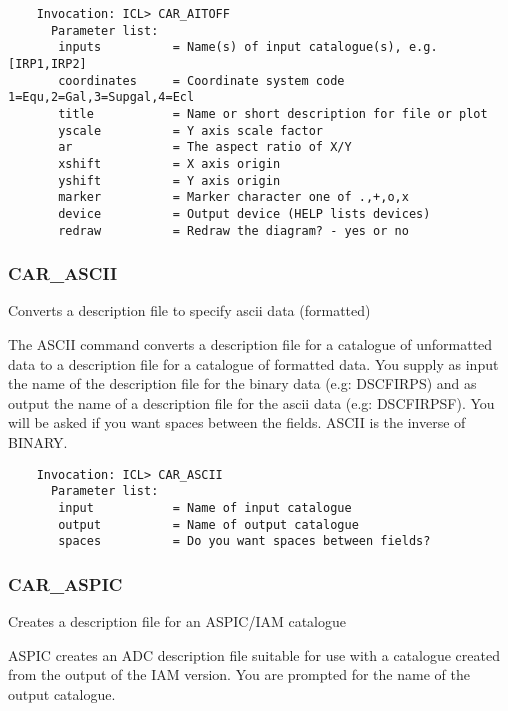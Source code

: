\begin{verbatim}
    Invocation: ICL> CAR_AITOFF
      Parameter list:
       inputs          = Name(s) of input catalogue(s), e.g. [IRP1,IRP2]
       coordinates     = Coordinate system code 1=Equ,2=Gal,3=Supgal,4=Ecl
       title           = Name or short description for file or plot
       yscale          = Y axis scale factor
       ar              = The aspect ratio of X/Y
       xshift          = X axis origin
       yshift          = Y axis origin
       marker          = Marker character one of .,+,o,x
       device          = Output device (HELP lists devices)
       redraw          = Redraw the diagram? - yes or no
\end{verbatim}

\subsubsection{CAR\_ASCII}

Converts a description file to specify ascii data (formatted)

The ASCII command converts a description file for a catalogue  of
unformatted  data  to a description file for a catalogue of formatted
data.
You supply as input the name of the description file for the
binary data (e.g: DSCFIRPS) and as output the name of a description
file for the ascii data (e.g: DSCFIRPSF).
You will be asked if you want spaces between the fields.
ASCII is the inverse of BINARY.

\begin{verbatim}
    Invocation: ICL> CAR_ASCII
      Parameter list:
       input           = Name of input catalogue
       output          = Name of output catalogue
       spaces          = Do you want spaces between fields?
\end{verbatim}

\subsubsection{CAR\_ASPIC}

Creates a description file for an ASPIC/IAM catalogue

ASPIC creates an ADC description file suitable for use with a
catalogue created from the output of the IAM version.
You are prompted for the name of the output catalogue.

